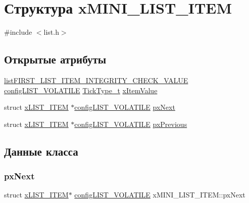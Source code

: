 \hypertarget{structx_m_i_n_i___l_i_s_t___i_t_e_m}{}\section{Структура x\+M\+I\+N\+I\+\_\+\+L\+I\+S\+T\+\_\+\+I\+T\+EM}
\label{structx_m_i_n_i___l_i_s_t___i_t_e_m}


{\ttfamily \#include $<$list.\+h$>$}

\subsection*{Открытые атрибуты}
\begin{DoxyCompactItemize}
\item 
\mbox{\hyperlink{list_8h_a3611bd5d5d87cb26ac1dc7a4852b94a0}{list\+F\+I\+R\+S\+T\+\_\+\+L\+I\+S\+T\+\_\+\+I\+T\+E\+M\+\_\+\+I\+N\+T\+E\+G\+R\+I\+T\+Y\+\_\+\+C\+H\+E\+C\+K\+\_\+\+V\+A\+L\+UE}} \mbox{\hyperlink{list_8h_a2d5de557c5561c8980d1bf51d87d8cba}{config\+L\+I\+S\+T\+\_\+\+V\+O\+L\+A\+T\+I\+LE}} \mbox{\hyperlink{portmacro_8h_aa69c48c6e902ce54f70886e6573c92a9}{Tick\+Type\+\_\+t}} \mbox{\hyperlink{structx_m_i_n_i___l_i_s_t___i_t_e_m_aae79c54ac1efa30959e68604cc23b29e}{x\+Item\+Value}}
\item 
struct \mbox{\hyperlink{structx_l_i_s_t___i_t_e_m}{x\+L\+I\+S\+T\+\_\+\+I\+T\+EM}} $\ast$\mbox{\hyperlink{list_8h_a2d5de557c5561c8980d1bf51d87d8cba}{config\+L\+I\+S\+T\+\_\+\+V\+O\+L\+A\+T\+I\+LE}} \mbox{\hyperlink{structx_m_i_n_i___l_i_s_t___i_t_e_m_aa7ae770b0f10daeb9ac76c6f7dd5608e}{px\+Next}}
\item 
struct \mbox{\hyperlink{structx_l_i_s_t___i_t_e_m}{x\+L\+I\+S\+T\+\_\+\+I\+T\+EM}} $\ast$\mbox{\hyperlink{list_8h_a2d5de557c5561c8980d1bf51d87d8cba}{config\+L\+I\+S\+T\+\_\+\+V\+O\+L\+A\+T\+I\+LE}} \mbox{\hyperlink{structx_m_i_n_i___l_i_s_t___i_t_e_m_a732c666bb97560eb1b094a2c411269ab}{px\+Previous}}
\end{DoxyCompactItemize}


\subsection{Данные класса}
\mbox{\label{structx_m_i_n_i___l_i_s_t___i_t_e_m_aa7ae770b0f10daeb9ac76c6f7dd5608e}} 
\subsubsection{\texorpdfstring{pxNext}{pxNext}}
{\footnotesize\ttfamily struct \mbox{\hyperlink{structx_l_i_s_t___i_t_e_m}{x\+L\+I\+S\+T\+\_\+\+I\+T\+EM}}$\ast$ \mbox{\hyperlink{list_8h_a2d5de557c5561c8980d1bf51d87d8cba}{config\+L\+I\+S\+T\+\_\+\+V\+O\+L\+A\+T\+I\+LE}} x\+M\+I\+N\+I\+\_\+\+L\+I\+S\+T\+\_\+\+I\+T\+E\+M\+::px\+Next}

